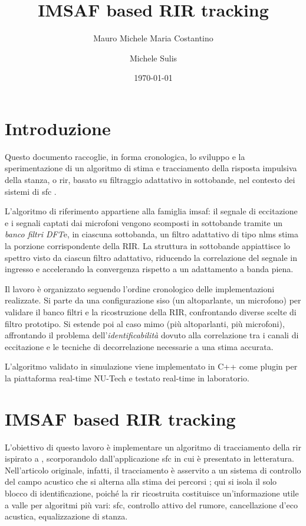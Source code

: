 \documentclass[11pt,a4paper]{article}
\title{IMSAF based RIR tracking}
\author{Mauro Michele Maria Costantino \and Michele Sulis}
\date{\today}
\begin{document}
	
	\maketitle
	
	\section{Introduzione}
	
	Questo documento raccoglie, in forma cronologica, lo sviluppo e la sperimentazione di un algoritmo di stima e tracciamento della risposta impulsiva della stanza, o \ac{rir}, basato su filtraggio adattativo in sottobande, nel contesto dei sistemi di \ac{sfc} \cite{11249060, 11464373}.
	
	L'algoritmo di riferimento appartiene alla famiglia \ac{imsaf}: il segnale di eccitazione e i segnali captati dai microfoni vengono scomposti in sottobande tramite un \emph{banco filtri DFT}e, in ciascuna sottobanda, un filtro adattativo di tipo \ac{nlms} stima la porzione corrispondente della RIR.
	La struttura in sottobande appiattisce lo spettro visto da ciascun filtro adattativo, riducendo la correlazione del segnale in ingresso e accelerando la convergenza rispetto a un adattamento a banda piena.
	
	Il lavoro è organizzato seguendo l'ordine cronologico delle implementazioni realizzate. 
	Si parte da una configurazione \ac{siso} (un altoparlante, un microfono) per validare il banco filtri e la ricostruzione della RIR, confrontando diverse scelte di filtro prototipo.
	Si estende poi al caso \ac{mimo} (più altoparlanti, più microfoni), affrontando il problema dell'\emph{identificabilità} dovuto alla correlazione tra i canali di eccitazione e le tecniche di decorrelazione necessarie a una stima accurata.
	
	L'algoritmo validato in simulazione viene implementato in C++ come plugin per la piattaforma real-time NU-Tech \cite{nutech} e testato real-time in laboratorio.
	
	\section{IMSAF based RIR tracking}
	L'obiettivo di questo lavoro è implementare un algoritmo di tracciamento della \ac{rir} ispirato a \cite{11464373}, scorporandolo dall'applicazione \ac{sfc} in cui è presentato in letteratura.
	Nell'articolo originale, infatti, il tracciamento è asservito a un sistema di controllo del campo acustico che si alterna alla stima dei percorsi \cite{11249060}; qui si isola il solo blocco di identificazione, poiché la \ac{rir} ricostruita costituisce un'informazione utile a valle per algoritmi più vari: \ac{sfc}, controllo attivo del rumore, cancellazione d'eco acustica, equalizzazione di stanza.
	
\end{document}
